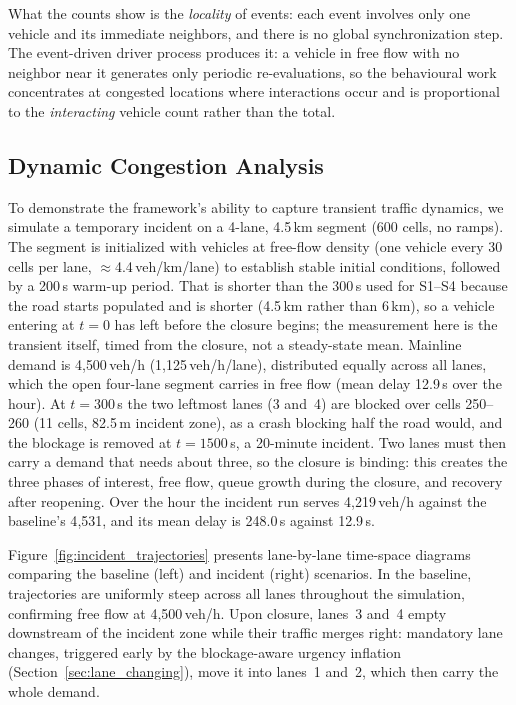 \documentclass[review,authoryear]{elsarticle}
\begin{document}
What the counts show is the \emph{locality} of events: each event involves only one vehicle and its immediate neighbors, and there is no global synchronization step. The event-driven driver process produces it: a vehicle in free flow with no neighbor near it generates only periodic re-evaluations, so the behavioural work concentrates at congested locations where interactions occur and is proportional to the \emph{interacting} vehicle count rather than the total.


\subsection{Dynamic Congestion Analysis}
\label{sec:exp_incident}

To demonstrate the framework's ability to capture transient traffic dynamics, we simulate a temporary incident on a 4-lane, 4.5\,km segment (600 cells, no ramps). The segment is initialized with vehicles at free-flow density (one vehicle every 30 cells per lane, $\approx$4.4\,veh/km/lane) to establish stable initial conditions, followed by a 200\,s warm-up period. That is shorter than the 300\,s used for S1--S4 because the road starts populated and is shorter (4.5\,km rather than 6\,km), so a vehicle entering at $t = 0$ has left before the closure begins; the measurement here is the transient itself, timed from the closure, not a steady-state mean. Mainline demand is 4{,}500\,veh/h (1{,}125\,veh/h/lane), distributed equally across all lanes, which the open four-lane segment carries in free flow (mean delay 12.9\,s over the hour). At $t = 300$\,s the two leftmost lanes (3 and~4) are blocked over cells 250--260 (11 cells, 82.5\,m incident zone), as a crash blocking half the road would, and the blockage is removed at $t = 1500$\,s, a 20-minute incident. Two lanes must then carry a demand that needs about three, so the closure is binding: this creates the three phases of interest, free flow, queue growth during the closure, and recovery after reopening. Over the hour the incident run serves 4{,}219\,veh/h against the baseline's 4{,}531, and its mean delay is 248.0\,s against 12.9\,s.

Figure~\ref{fig:incident_trajectories} presents lane-by-lane time-space diagrams comparing the baseline (left) and incident (right) scenarios. In the baseline, trajectories are uniformly steep across all lanes throughout the simulation, confirming free flow at 4{,}500\,veh/h. Upon closure, lanes~3 and~4 empty downstream of the incident zone while their traffic merges right: mandatory lane changes, triggered early by the blockage-aware urgency inflation (Section~\ref{sec:lane_changing}), move it into lanes~1 and~2, which then carry the whole demand.
\end{document}
